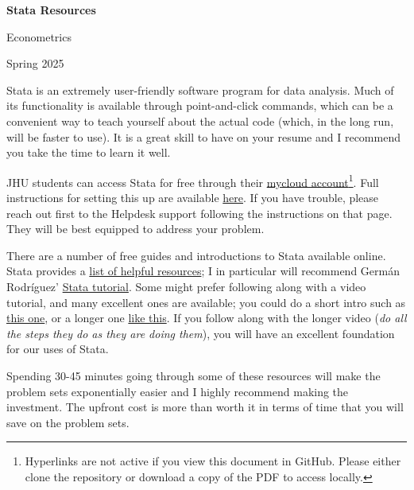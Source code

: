 \documentclass{article}
\begin{document}
\begin{center}
    \Large
    \textbf{Stata Resources}
    \normalsize

    \vspace{1mm}

    Econometrics

    \vspace{1mm}

    Spring 2025
\end{center}
\medskip

Stata is an extremely user-friendly software program for data analysis. Much of its functionality is available through point-and-click commands, which can be a convenient way to teach yourself about the actual code (which, in the long run, will be faster to use). It is a great skill to have on your resume and I recommend you take the time to learn it well.

\vspace{2mm}

JHU students can access Stata for free through their \href{http://mycloud.jh.edu/}{mycloud account}\footnote{Hyperlinks are not active if you view this document in GitHub. Please either clone the repository or download a copy of the PDF to access locally.}. Full instructions for setting this up are available \href{https://studentaffairs.jhu.edu/computing/campus-resources/myjlab/}{here}. If you have trouble, please reach out first to the Helpdesk support following the instructions on that page. They will be best equipped to address your problem.

\vspace{2mm}

There are a number of free guides and introductions to Stata available online. Stata provides a \href{https://www.stata.com/links/resources-for-learning-stata/}{list of helpful resources}; I in particular will recommend Germ\'an Rodr\'iguez' \href{https://grodri.github.io/stata/}{Stata tutorial}. Some might prefer following along with a video tutorial, and many excellent ones are available; you could do a short intro such as \href{https://www.youtube.com/watch?v=rdFw-fBfygQ&t=657s}{this one}, or a longer one \href{https://www.youtube.com/watch?v=gdnDkjoPJTM}{like this}. If you follow along with the longer video (\textit{do all the steps they do as they are doing them}), you will have an excellent foundation for our uses of Stata.

\vspace{2mm}

Spending 30-45 minutes going through some of these resources will make the problem sets exponentially easier and I highly recommend making the investment. The upfront cost is more than worth it in terms of time that you will save on the problem sets.
\end{document}
